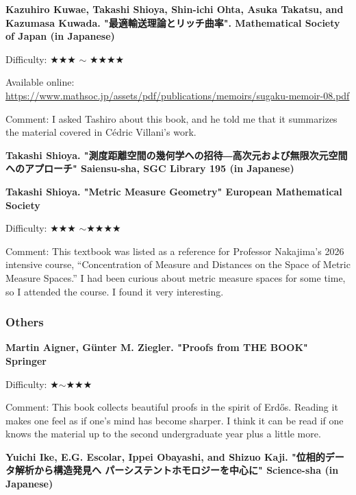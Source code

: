 \textbf{Kazuhiro Kuwae, Takashi Shioya, Shin-ichi Ohta, Asuka Takatsu, and Kazumasa Kuwada. "最適輸送理論とリッチ曲率". Mathematical Society of Japan (in Japanese)} \vspace{-6pt}

Difficulty: ★★★ $\sim$ ★★★★ \vspace{-6pt}

Available online: \url{https://www.mathsoc.jp/assets/pdf/publications/memoirs/sugaku-memoir-08.pdf}

Comment: I asked Tashiro about this book, and he told me that it summarizes the material covered in Cédric Villani's work.

\textbf{Takashi Shioya. "測度距離空間の幾何学への招待―高次元および無限次元空間へのアプローチ" Saiensu-sha, SGC Library 195 (in Japanese)}　\vspace{-6pt}

\textbf{Takashi Shioya. "Metric Measure Geometry" European Mathematical Society}　\vspace{-6pt}

Difficulty: ★★★ $\sim$★★★★　\vspace{-6pt}

Comment: This textbook was listed as a reference for Professor Nakajima's 2026 intensive course, ``Concentration of Measure and Distances on the Space of Metric Measure Spaces.''
I had been curious about metric measure spaces for some time, so I attended the course. I found it very interesting.


\subsubsection{Others}


\textbf{Martin Aigner, G\"unter M. Ziegler. "Proofs from THE BOOK" Springer}  　\vspace{-6pt} 

Difficulty: ★$\sim$★★★ 　\vspace{-6pt} 

Comment: This book collects beautiful proofs in the spirit of Erd\H{o}s. Reading it makes one feel as if one's mind has become sharper. I think it can be read if one knows the material up to the second undergraduate year plus a little more.
\vspace{8pt}

\textbf{Yuichi Ike, E.G. Escolar, Ippei Obayashi, and Shizuo Kaji. "位相的データ解析から構造発見へ パーシステントホモロジーを中心に" Science-sha (in Japanese)}  　\vspace{-6pt} 

